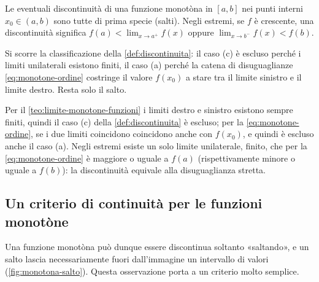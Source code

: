 \begin{corollario}\label{cor:monotone-salti}
Le eventuali discontinuità di una funzione monotòna in $[a,b]$ nei punti interni
$x_{0}\in(a,b)$ sono tutte di prima specie (salti). Negli estremi, se $f$ è crescente,
una discontinuità significa $f(a)<\lim_{x\to a^{+}}f(x)$ oppure
$\lim_{x\to b^{-}}f(x)<f(b)$.
\end{corollario}

\begin{schema}
\end{schema}

\begin{strategia}
Si scorre la classificazione della \cref{def:discontinuita}: il caso (c) è escluso perché
i limiti unilaterali esistono finiti, il caso (a) perché la catena di disuguaglianze
\eqref{eq:monotone-ordine} costringe il valore $f(x_{0})$ a stare tra il limite sinistro
e il limite destro. Resta solo il salto.
\end{strategia}

\begin{dimostrazione}
Per il \cref{teo:limite-monotone-funzioni} i limiti destro e sinistro esistono sempre
finiti, quindi il caso (c) della \cref{def:discontinuita} è escluso; per la
\eqref{eq:monotone-ordine}, se i due limiti coincidono coincidono anche con $f(x_{0})$,
e quindi è escluso anche il caso (a). Negli estremi esiste un solo limite unilaterale,
finito, che per la \eqref{eq:monotone-ordine} è maggiore o uguale a $f(a)$ (rispettivamente
minore o uguale a $f(b)$): la discontinuità equivale alla disuguaglianza stretta.
\end{dimostrazione}

\subsection{Un criterio di continuità per le funzioni monotòne}

Una funzione monotòna può dunque essere discontinua soltanto «saltando», e un salto
lascia necessariamente fuori dall'immagine un intervallo di valori (\cref{fig:monotona-salto}).
Questa osservazione porta a un criterio molto semplice.

